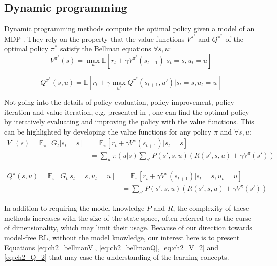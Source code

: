 \subsection{Dynamic programming}
Dynamic programming \citep{bellman1966dynamic} methods compute the optimal policy given a model of an MDP \citep{sutton2018reinforcement}.
They rely on the property that the value functions $V^{\pi^*}$ and $Q^{\pi^*}$ of the optimal policy ${\pi^*}$ satisfy the Bellman equations $\forall s, u$:
\begin{equation}
\label{eq:ch2_bellmanV}
    V^{\pi^*}(s) = \max_u \mathbb{E}[r_t + \gamma V^{\pi^*}(s_{t+1})| s_t=s, u_t=u]
\end{equation}

\begin{equation}
\label{eq:ch2_bellmanQ}
    Q^{\pi^*}(s, u) = \mathbb{E}[r_t + \gamma \max_{u'} Q^{\pi^*}(s_{t+1}, u') |s_t=s, u_t=u]
\end{equation}

Not going into the details of policy evaluation, policy improvement, policy iteration and value iteration, e.g. presented in \citep{sutton2018reinforcement}, one can find the optimal policy by iteratively evaluating and improving the policy with the value functions.
This can be highlighted by developing the value functions for any policy $\pi$ and $\forall s, u$:
\begin{equation}
\label{eq:ch2_V_2}
\begin{split}
    V^\pi(s)= \mathbb{E}_{\pi}\left[G_t|s_t=s\right] & = \mathbb{E}_{\pi}\left[r_t + \gamma V^\pi(s_{t+1})|s_t=s\right]\\
     & = \sum_{u} \pi(u|s) \sum_{s'} P(s', s, u) (R(s', s, u) + \gamma V^\pi(s'))
\end{split}
\end{equation}

\begin{equation}
\label{eq:ch2_Q_2}
\begin{split}
    Q^\pi(s, u) = \mathbb{E}_{\pi}\left[G_t|s_t=s, u_t=u\right] & = \mathbb{E}_{\pi}\left[r_t + \gamma V^\pi(s_{t+1})|s_t=s, u_t=u \right] \\
    &  = \sum_{s'} P(s', s, u) (R(s', s, u) + \gamma V^\pi(s'))
\end{split}
\end{equation}

In addition to requiring the model knowledge $P$ and $R$, the complexity of these methods increases with the size of the state space, often referred to as the curse of dimensionality, which may limit their usage.
Because of our direction towards model-free RL, without the model knowledge, our interest here is to present Equations \ref{eq:ch2_bellmanV}, \ref{eq:ch2_bellmanQ}, \ref{eq:ch2_V_2} and \ref{eq:ch2_Q_2} that may ease the understanding of the learning concepts.


